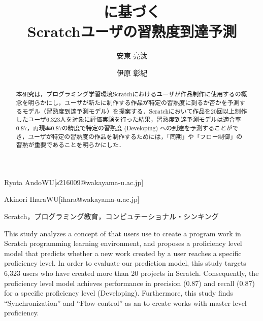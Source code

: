 \documentclass[submit]{ipsj}
\begin{document}
\title{\textcolor{red}{}に基づく\\Scratchユーザの習熟度到達予測}




\author{安東 亮汰}{Ryota Ando}{WU}[s216009@wakayama-u.ac.jp]
\author{伊原 彰紀}{Akinori Ihara}{WU}[ihara@wakayama-u.ac.jp]

\begin{abstract}
本研究は，プログラミング学習環境Scratchにおけるユーザが作品制作に使用する\textcolor{red}{}の概念を明らかにし，ユーザが新たに制作する作品が特定の習熟度に到るか否かを予測するモデル（習熟度到達予測モデル）を提案する．Scratchにおいて作品を20回以上制作したユーザ6,323人を対象に評価実験を行った結果，習熟度到達予測モデルは適合率0.87，再現率0.87の精度で特定の習熟度 (Developing) への到達を予測することができ，ユーザが特定の習熟度の作品を制作するためには，\textcolor{red}{}「同期」や「フロー制御」の習熟が重要であることを明らかにした．
\end{abstract}

\begin{jkeyword}
Scratch，プログラミング教育，コンピュテーショナル・シンキング
\end{jkeyword}

\begin{eabstract}
This study analyzes a concept of \textcolor{red}{} that users use to create a program work in Scratch programming learning environment, and proposes a proficiency level model that predicts whether a new work created by a user reaches a specific proficiency level. In order to evaluate our prediction model, this study targets 6,323 users who have created more than 20 projects in Scratch. Consequently, the proficiency level model achieves performance in precision (0.87) and recall (0.87) for a specific proficiency level (Developing). Furthermore, this study finds ``Synchronization'' and ``Flow control'' as an \textcolor{red}{} to create works with master level proficiency.
\end{eabstract}
\end{document}
